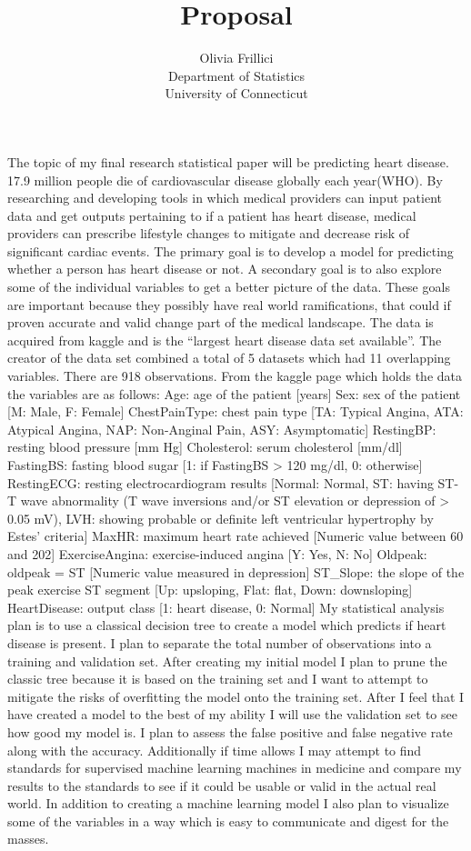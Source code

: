 \documentclass[12pt]{article}
\title{Proposal}
\author{Olivia Frillici\\
  Department of Statistics\\
  University of Connecticut
}
\begin{document}
\maketitle
The topic of my final research statistical paper will be predicting heart disease. 17.9 million people die of cardiovascular disease globally each year(WHO). By researching and developing tools in which medical providers can input patient data and get outputs pertaining to if a patient has heart disease, medical providers can prescribe lifestyle changes to mitigate and decrease risk of significant cardiac events. 
The primary goal is to develop a model for predicting whether a person has heart disease or not. A secondary goal is to also explore some of the individual variables to get a better picture of the data. These goals are important because they possibly have real world ramifications, that could if proven accurate and valid change part of the medical landscape. 
The data is acquired from kaggle and is the “largest heart disease data set available”. The creator of the data set combined a total of 5 datasets which had 11 overlapping variables. There are 918 observations. From the kaggle page which holds the data the variables are as follows: 
Age: age of the patient [years]
Sex: sex of the patient [M: Male, F: Female]
ChestPainType: chest pain type [TA: Typical Angina, ATA: Atypical Angina, NAP: Non-Anginal Pain, ASY: Asymptomatic]
RestingBP: resting blood pressure [mm Hg]
Cholesterol: serum cholesterol [mm/dl]
FastingBS: fasting blood sugar [1: if FastingBS > 120 mg/dl, 0: otherwise]
RestingECG: resting electrocardiogram results [Normal: Normal, ST: having ST-T wave abnormality (T wave inversions and/or ST elevation or depression of > 0.05 mV), LVH: showing probable or definite left ventricular hypertrophy by Estes' criteria]
MaxHR: maximum heart rate achieved [Numeric value between 60 and 202]
ExerciseAngina: exercise-induced angina [Y: Yes, N: No]
Oldpeak: oldpeak = ST [Numeric value measured in depression]
ST_Slope: the slope of the peak exercise ST segment [Up: upsloping, Flat: flat, Down: downsloping]
HeartDisease: output class [1: heart disease, 0: Normal]
My statistical analysis plan is to use a classical decision tree to create a model which predicts if heart disease is present. I plan to separate the total number of observations into a training and validation set. After creating my initial model I plan to prune the classic tree because it is based on the training set and I want to attempt to mitigate the risks of overfitting the model onto the training set. After I feel that I have created a model to the best of my ability I will use the validation set to see how good my model is. I plan to assess the false positive and false negative rate along with the accuracy. Additionally if time allows I may attempt to find standards for supervised machine learning machines in medicine and compare my results to the standards to see if it could be usable or valid in the actual real world. In addition to creating a machine learning model I also plan to visualize some of the variables in a way which is easy to communicate and digest for the masses. 
\end{document}

